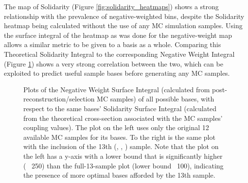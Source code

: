    The map of Solidarity (Figure \ref{fig:solidarity_heatmaps}) shows a strong relationship with the prevalence of negative-weighted bins,
        despite the Solidarity heatmap being calculated without the use of any MC simulation samples.
    Using the surface integral of the heatmap as was done for the negative-weight map allows a similar metric to be given to a basis as a whole.
    Comparing this Theoretical Solidarity Integral to the corresponding Negative Weight Integral (Figure \ref{fig:nWeight_solidarity_scatter})
        shows a very strong correlation between the two,
        which can be exploited to predict useful sample bases before generating any MC samples.

    \begin{figure}[tbh]
        \caption{
            Plots of the Negative Weight Surface Integral (calculated from post-reconstruction/selection MC samples)
                of all possible bases, with respect to the same bases' Solidarity Surface Integral
                (calculated from the theoretical cross-section associated with the MC samples' coupling values).
            The plot on the left uses only the original 12 available MC samples for its bases.
            To the right is the same plot with the inclusion of the 13th (, , ) sample.
            Note that the plot on the left has a y-axis with a lower bound that is significantly higher (~ 250) 
                than the full-13-sample plot (lower bound ~100),
                indicating the presence of more optimal bases afforded by the 13th sample.
        }
        \label{fig:nWeight_solidarity_scatter}
    \end{figure}


